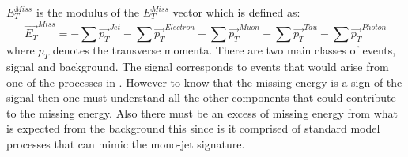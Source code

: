 $E_T^{Miss}$ is the modulus of the $E_T^{Miss}$ vector which is defined as:
\begin{equation}\label{eq:etmiss}
\vec{E_T}^{Miss} = - \sum \vec{p_T}^{Jet} - \sum \vec{p_T}^{Electron} - \sum \vec{p_T}^{Muon} - \sum \vec{p_T}^{Tau} - \sum \vec{p_T}^{Photon}
\end{equation}  
where $p_T$ denotes the transverse momenta.
There are two main classes of events, signal and background. 
The signal corresponds to events that would arise from one of the processes in . However to know that the missing energy is a sign of the signal then one must understand all the other components that could contribute to the missing energy. Also there must be an excess of missing energy from what is expected from the background this since is it comprised of standard model processes that can mimic the mono-jet signature.
